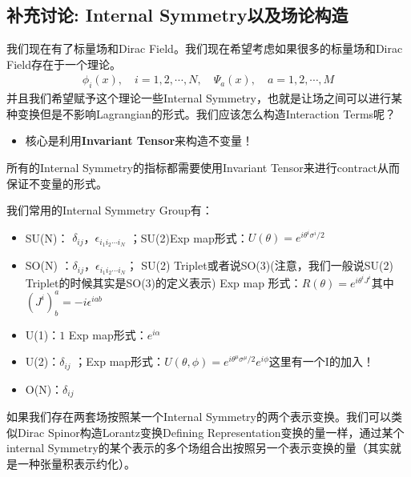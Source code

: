\subsection{补充讨论: Internal Symmetry以及场论构造}


我们现在有了标量场和Dirac Field。我们现在希望考虑如果很多的标量场和Dirac Field存在于一个理论。
\begin{align}
  \phi_i(x),\quad i=1,2,\cdots,N, \quad \Psi_a(x),\quad a=1,2,\cdots,M
\end{align}
并且我们希望赋予这个理论一些Internal
Symmetry，也就是让场之间可以进行某种变换但是不影响Lagrangian的形式。我们应该怎么构造Interaction Terms呢？
\begin{itemize}
  \item 核心是利用\textbf{Invariant Tensor}来构造不变量！
\end{itemize}
所有的Internal Symmetry的指标都需要使用Invariant Tensor来进行contract从而保证不变量的形式。

\bigskip
{}

我们常用的Internal Symmetry Group有：
\begin{itemize}
  \item SU(N)： $  \delta_{ij} $，$ \epsilon_{i_1 i_2 \cdots i_N} $
    ；SU(2)Exp map形式：$  U(\theta) = e^{i\theta^i \sigma^i/2 } $
  \item SO(N) ：$ \delta_{ij} $，$ \epsilon_{i_1 i_2 \cdots i_N} $；
    SU(2) Triplet或者说SO(3)(注意，我们一般说SU(2) Triplet的时候其实是SO(3)的定义表示) Exp
    map 形式：$  R(\theta) = e^{i\theta^i J^i } $其中$ (J^i)^a_b = -i\epsilon^{iab} $
  \item U(1)：$ 1 $ Exp map形式：$  e^{i\alpha} $
  \item U(2)：$ \delta_{ij} $ ；Exp map形式：$  U(\theta,\phi) =
    e^{i\theta^\mu \sigma^\mu/2 } e^{i\phi} $这里有一个I的加入！
  \item O(N)：$ \delta_{ij} $
\end{itemize}

\bigskip
{}

如果我们存在两套场按照某一个Internal Symmetry的两个表示变换。我们可以类似Dirac
Spinor构造Lorantz变换Defining Representation变换的量一样，通过某个internal
Symmetry的某个表示的多个场组合出按照另一个表示变换的量（其实就是一种张量积表示约化）。

